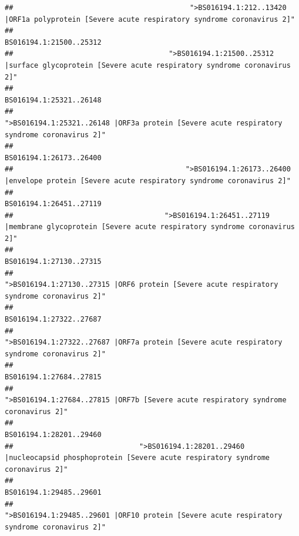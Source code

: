 \documentclass[
]{article}
\begin{document}
\begin{verbatim}
##                                          ">BS016194.1:212..13420 |ORF1a polyprotein [Severe acute respiratory syndrome coronavirus 2]" 
##                                                                                                                BS016194.1:21500..25312 
##                                     ">BS016194.1:21500..25312 |surface glycoprotein [Severe acute respiratory syndrome coronavirus 2]" 
##                                                                                                                BS016194.1:25321..26148 
##                                            ">BS016194.1:25321..26148 |ORF3a protein [Severe acute respiratory syndrome coronavirus 2]" 
##                                                                                                                BS016194.1:26173..26400 
##                                         ">BS016194.1:26173..26400 |envelope protein [Severe acute respiratory syndrome coronavirus 2]" 
##                                                                                                                BS016194.1:26451..27119 
##                                    ">BS016194.1:26451..27119 |membrane glycoprotein [Severe acute respiratory syndrome coronavirus 2]" 
##                                                                                                                BS016194.1:27130..27315 
##                                             ">BS016194.1:27130..27315 |ORF6 protein [Severe acute respiratory syndrome coronavirus 2]" 
##                                                                                                                BS016194.1:27322..27687 
##                                            ">BS016194.1:27322..27687 |ORF7a protein [Severe acute respiratory syndrome coronavirus 2]" 
##                                                                                                                BS016194.1:27684..27815 
##                                                    ">BS016194.1:27684..27815 |ORF7b [Severe acute respiratory syndrome coronavirus 2]" 
##                                                                                                                BS016194.1:28201..29460 
##                              ">BS016194.1:28201..29460 |nucleocapsid phosphoprotein [Severe acute respiratory syndrome coronavirus 2]" 
##                                                                                                                BS016194.1:29485..29601 
##                                            ">BS016194.1:29485..29601 |ORF10 protein [Severe acute respiratory syndrome coronavirus 2]" 

\end{verbatim}
\end{document}
